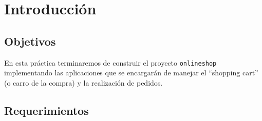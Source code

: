 \documentclass[12pt]{article} %
\newcommand{\project}{\texttt{onlineshop}}%
\begin{document}

\tableofcontents %

\newpage %




\section {Introducción}

\subsection{Objetivos}
En esta práctica terminaremos de construir el proyecto \project{} implementando las aplicaciones que se encargarán de manejar el ``shopping cart'' (o carro de la compra) y la realización de pedidos. 

\subsection{Requerimientos}
\end{document}
